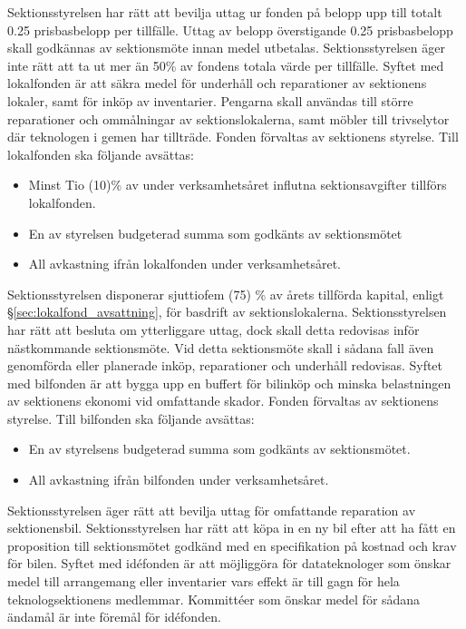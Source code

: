 \documentclass[a4paper]{dteklag}
\newcommand{\prisbasbelopp}[1]{
    #1 prisbasbelopp
    \ifdef{\nuvarandeprisbasbelopp}{
        \marginpar{
            \small{ \textbf{\roundandprint{\xintiexpr#1 * \nuvarandeprisbasbelopp\relax}kr}}
        }
    }{}
}
\begin{document}
\para Sektionsstyrelsen har rätt att bevilja uttag ur fonden på belopp upp till totalt \prisbasbelopp{0.25} per tillfälle. Uttag av belopp överstigande \prisbasbelopp{0.25} skall godkännas av sektionsmöte innan medel utbetalas.
\para Sektionsstyrelsen äger inte rätt att ta ut mer än 50\% av fondens totala värde per tillfälle.
\para[Lokalfonden] Syftet med lokalfonden är att säkra medel för underhåll och reparationer av sektionens lokaler, samt för inköp av inventarier. Pengarna skall användas till större reparationer och ommålningar av sektionslokalerna, samt möbler till trivselytor där teknologen i gemen har tillträde.
\para Fonden förvaltas av sektionens styrelse.
\para Till lokalfonden ska följande avsättas:
\begin{itemize}
\item Minst Tio (10)\% av under verksamhetsåret influtna sektionsavgifter tillförs lokalfonden.
\item En av styrelsen budgeterad summa som godkänts av sektionsmötet
\item All avkastning ifrån lokalfonden under verksamhetsåret.
\end{itemize}
\para Sektionsstyrelsen disponerar sjuttiofem (75) \% av årets tillförda kapital, enligt \S\ref{sec:lokalfond_avsattning}, för basdrift av sektionslokalerna.
\para Sektionsstyrelsen har rätt att besluta om ytterliggare uttag, dock skall detta redovisas inför nästkommande sektionsmöte. Vid detta sektionsmöte skall i sådana fall även genomförda eller planerade inköp, reparationer och underhåll redovisas.
\para[Bilfonden] Syftet med bilfonden är att bygga upp en buffert för bilinköp och minska belastningen av sektionens ekonomi vid omfattande skador.
\para Fonden förvaltas av sektionens styrelse.
\para Till bilfonden ska följande avsättas:
\begin{itemize}
\item En av styrelsens budgeterad summa som godkänts av sektionsmötet.
\item All avkastning ifrån bilfonden under verksamhetsåret.
\end{itemize}
\para Sektionsstyrelsen äger rätt att bevilja uttag för omfattande reparation av sektionensbil.
\para Sektionsstyrelsen har rätt att köpa in en ny bil efter att ha fått en proposition till sektionsmötet godkänd med en specifikation på kostnad och krav för bilen.
\para[Idéfonden] Syftet med idéfonden är att möjliggöra för datateknologer som önskar medel till arrangemang eller inventarier vars effekt är till gagn för hela teknologsektionens medlemmar. Kommittéer som önskar medel för sådana ändamål är inte föremål för idéfonden.
\end{document}

